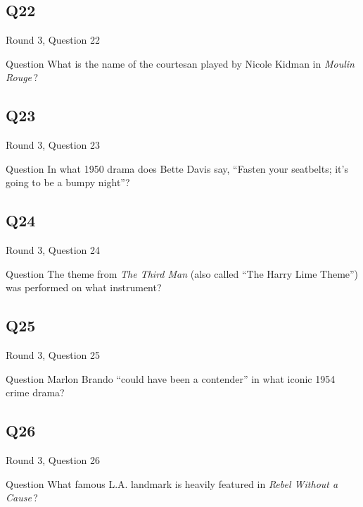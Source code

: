 \documentclass[11pt]{beamer}
\begin{document}
\subsection*{Q22}
\begin{frame}[t]{Round 3, Question 22}
\vspace{2em}
\begin{block}{Question}
What is the name of the courtesan played by Nicole Kidman in \emph{Moulin Rouge}\,?
\end{block}
\end{frame}
    

\subsection*{Q23}
\begin{frame}[t]{Round 3, Question 23}
\vspace{2em}
\begin{block}{Question}
In what 1950 drama does Bette Davis say, ``Fasten your seatbelts; it's going to be a bumpy night''?
\end{block}
\end{frame}
    

\subsection*{Q24}
\begin{frame}[t]{Round 3, Question 24}
\vspace{2em}
\begin{block}{Question}
The theme from \emph{The Third Man} (also called ``The Harry Lime Theme'') was performed on what instrument?
\end{block}
\end{frame}
    

\subsection*{Q25}
\begin{frame}[t]{Round 3, Question 25}
\vspace{2em}
\begin{block}{Question}
Marlon Brando ``could have been a contender'' in what iconic 1954 crime drama?
\end{block}
\end{frame}
    

\subsection*{Q26}
\begin{frame}[t]{Round 3, Question 26}
\vspace{2em}
\begin{block}{Question}
What famous L.A. landmark is heavily featured in \emph{Rebel Without a Cause}\,?
\end{block}
\end{frame}
    
\end{document}
